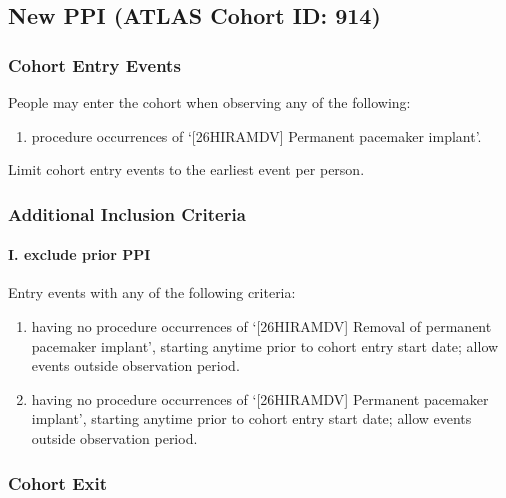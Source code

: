 \documentclass[
  12pt,
]{article}
\providecommand{\tightlist}{%
  \setlength{\itemsep}{0pt}\setlength{\parskip}{0pt}}
\begin{document}
\subsection{New PPI (ATLAS Cohort ID:
914)}\label{new-ppi-atlas-cohort-id-914}

\subsubsection{Cohort Entry Events}\label{cohort-entry-events-14}

People may enter the cohort when observing any of the following:

\begin{enumerate}
\def\labelenumi{\arabic{enumi}.}
\tightlist
\item
  procedure occurrences of `{[}26HIRAMDV{]} Permanent pacemaker
  implant'.
\end{enumerate}

Limit cohort entry events to the earliest event per person.

\subsubsection{Additional Inclusion
Criteria}\label{additional-inclusion-criteria-9}

\paragraph*{I. exclude prior PPI}\label{i.-exclude-prior-ppi}

Entry events with any of the following criteria:

\begin{enumerate}
\def\labelenumi{\arabic{enumi}.}
\tightlist
\item
  having no procedure occurrences of `{[}26HIRAMDV{]} Removal of
  permanent pacemaker implant', starting anytime prior to cohort entry
  start date; allow events outside observation period.
\item
  having no procedure occurrences of `{[}26HIRAMDV{]} Permanent
  pacemaker implant', starting anytime prior to cohort entry start date;
  allow events outside observation period.
\end{enumerate}

\subsubsection{Cohort Exit}\label{cohort-exit-14}
\end{document}
